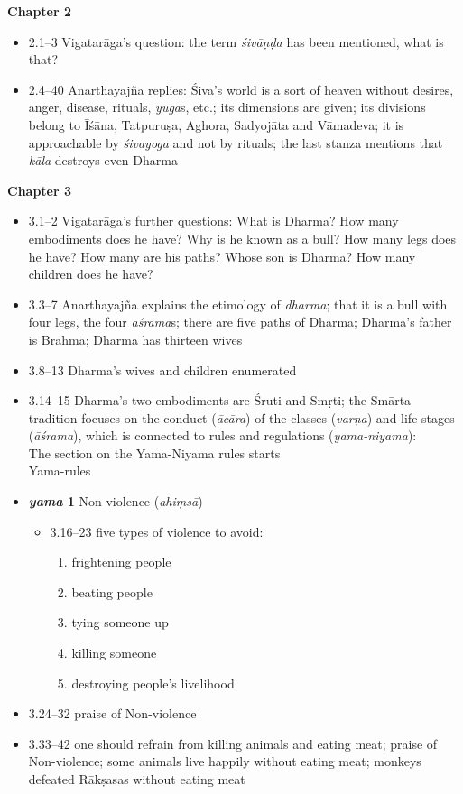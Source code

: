 \documentclass[11pt]{book} %
\newcommand{\skt}[1]{\textit{#1}}
\begin{document}
\textbf{Chapter 2}
\begin{itemize}
\item 2.1--3 Vigatarāga's question: the term \skt{śivāṇḍa} has been mentioned,
    what is that?
\item 2.4--40 Anarthayajña replies:
 Śiva's world is a sort of heaven without desires,
    anger, disease, rituals, \skt{yuga}s, etc.; its dimensions are given;
   its divisions belong to Īśāna, Tatpuruṣa, Aghora, Sadyojāta and
   Vāmadeva; it is approachable by \skt{śivayoga} and not
   by rituals; the last stanza mentions that \skt{kāla} destroys even
   Dharma
\end{itemize}

\pagebreak


\textbf{Chapter 3}
\begin{itemize}
\item 3.1--2 Vigatarāga's further questions:  
What is Dharma? 
How many embodiments does he have? 
Why is he known as a bull? 
How many legs does he have? 
How many are his paths? Whose son is Dharma? 
How many children does he have?
\item 3.3--7 Anarthayajña explains the etimology of \skt{dharma}; 
that it is a bull with four legs, the four \skt{āśrama}s; there are five paths
of Dharma; Dharma's father is Brahmā; Dharma has thirteen wives 
\item 3.8--13 Dharma's wives and children enumerated
\item 3.14--15 Dharma's two embodiments are Śruti and Smṛti;
the Smārta tradition focuses on  the conduct (\skt{ācāra}) of the classes (\skt{varṇa}) and life-stages (\skt{āśrama}),
which is connected to rules and regulations (\skt{yama-niyama}):\\
   The section on the Yama-Niyama rules starts\\
   Yama-rules  

\item \textbf{\skt{yama} 1} Non-violence (\skt{ahiṃsā})
 \begin{itemize}
\item 3.16--23  five types of violence to avoid:
\begin{enumerate}
\item frightening people
\item beating people
\item tying someone up 
\item killing someone 
\item destroying people’s livelihood
\end{enumerate}
\end{itemize}
\item 3.24--32 praise of Non-violence
\item 3.33--42 one should refrain from killing animals and eating meat; praise of Non-violence; some animals live happily without
eating meat; monkeys defeated Rākṣasas without eating meat
\end{itemize}
\end{document}
